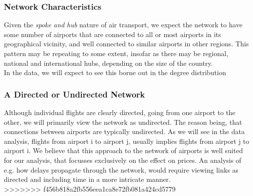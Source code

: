 \subsubsection{Network Characteristics}
Given the \textit{spoke and hub} nature of air transport, we expect the network to have some number of airports that are connected to all or most airports in its geographical vicinity, and well connected to similar airports in other regions. This pattern may be repeating to some extent, insofar as there may be regional, national and international hubs, depending on the size of the country. \\
In the data, we will expect to see this borne out in the degree distribution

\subsubsection{A Directed or Undirected Network}
Although individual flights are clearly directed, going from one airport to the other, we will primarily view the network as undirected. The reason being, that connections between airports are typically undirected. 
As we will see in the data analysis, flights from airport i to airport j, usually implies flights from airport j to airport i. We believe that this approach to the network of airports is well suited for our analysis, that focusses exclusively on the effect on prices. An analysis of e.g. how delays propagate through the network, would require viewing links as directed and including time in a more intricate manner.\\



>>>>>>> f456b818a2fb556eea1ca8e72fb081a424cd5779


